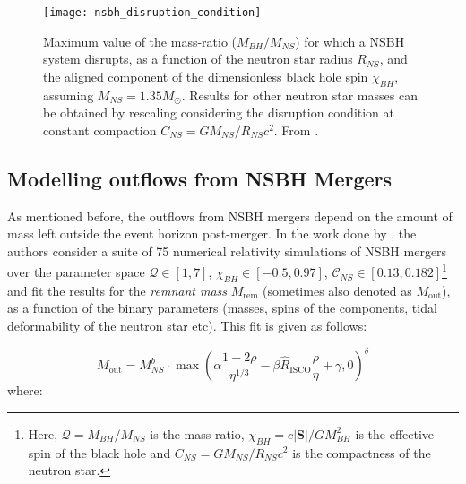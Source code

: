     \begin{figure}[H]
        \centering
        \texttt{[image: nsbh\_disruption\_condition]}
        \caption[Disruption condition in a NSBH binary]{
                    Maximum value of the mass-ratio ($M_{BH}/M_{NS}$) for which a NSBH
                    system disrupts, as a function of the neutron star radius $R_{NS}$,
                    and the aligned component of the dimensionless black hole spin
                    $\chi_{BH}$, assuming $M_{NS} = 1.35 M_{\odot}$. Results for other
                    neutron star masses can be obtained by rescaling considering the
                    disruption condition at constant compaction $C_{NS} = GM_{NS}/R_{NS}
                    c^2$. From \cite{foucart_2020}.
            }
        \label{fig:nsbh_disruption_condition}
    \end{figure}

    \subsection{Modelling outflows from NSBH Mergers}\label{ssec:outflows-nsbh}

    As mentioned before, the outflows from NSBH mergers depend on the amount of mass
    left outside the event horizon post-merger. In the work done by \cite{foucart_2018},
    the authors consider a suite of 75 numerical relativity simulations of NSBH mergers
    over the parameter space $\mathcal{Q} \in [1, 7]$, $ \chi_{BH} \in [-0.5, 0.97]$,
    $\mathcal{C}_{NS} \in [0.13, 0.182]$\footnote{
        Here, $\mathcal{Q} = M_{BH}/M_{NS}$ is the mass-ratio, $\chi_{BH} =
        c|\mathbf{S}|/GM_{BH}^2$ is the effective spin of the black hole and $C_{NS} =
        GM_{NS}/R_{NS}c^2$ is the compactness of the neutron star.
    }
    and fit the results for the \textit{remnant mass} $M_{\mathrm{rem}}$ (sometimes also
    denoted as $M_{\mathrm{out}}$), as a function of the binary parameters (masses,
    spins of the components, tidal deformability of the neutron star etc). This fit is
    given as follows:

    \begin{equation}
        M_{\mathrm{out}} =
            M_{NS}^b \cdot
            \max \left( \alpha \dfrac{1-2\rho}{\eta^{1/3}} -
            \beta \hat{R}_{\mathrm{ISCO}} \dfrac{\rho}{\eta} + \gamma, 0 \right)^\delta
        \label{eq:m_out}
    \end{equation}
    where:

